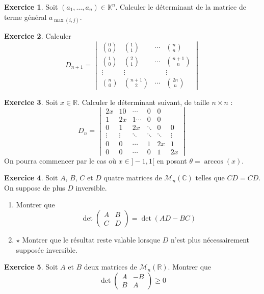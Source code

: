 \documentclass[french]{book}
\newcommand{\R}{\mathbb{R}}
\newcommand{\C}{\mathbb{C}}
\newcommand{\K}{\mathbb{K}}
\theoremstyle{definition}
\newtheorem{ex}{Exercice}[chapter]
\theoremstyle{theorem}
\theoremstyle{remark}
\begin{document}
\begin{ex}
	Soit $(a_1,\ldots,a_n)\in\K^n$. Calculer le déterminant de la matrice de terme général $a_{\max(i,j)}$.
\end{ex}

\begin{ex}
	Calculer $$D_{n+1}=\begin{vmatrix}
		\binom{0}{0}&\binom{1}{1}&\cdots&\binom{n}{n}\\
		\binom{1}{0}&\binom{2}{1}&\cdots&\binom{n+1}{n}\\
		\vdots&\vdots&&\vdots\\
		\binom{n}{0}&\binom{n+1}{2}&\cdots&\binom{2n}{n}
	\end{vmatrix}$$
\end{ex}

\begin{ex}
	Soit $x\in\R$. Calculer le déterminant suivant, de taille $n\times n$ : $$D_n=\begin{vmatrix}
		2x&10&\cdots&0&0\\
		1&2x&1\cdots&0&0\\
		0&1&2x&\ddots&0&0\\
		\vdots&\vdots&\ddots&\ddots&\ddots&\vdots\\
		0&0&\cdots&1&2x&1\\
		0&0&\cdots&0&1&2x
	\end{vmatrix}$$ On pourra commencer par le cas où $x\in]-1,1[$ en posant $\theta=\arccos(x)$.
\end{ex}

\begin{ex}
	Soit $A$, $B$, $C$ et $D$ quatre matrices de $\mathcal{M}_n(\C)$ telles que $CD=CD$. On suppose de plus $D$ inversible. 
	\begin{enumerate}
	\item Montrer que $$\det\begin{pmatrix}
		A&B\\
		C&D
	\end{pmatrix}=\det(AD-BC)$$
	\item $\star$ Montrer que le résultat reste valable lorsque $D$ n'est plus nécessairement supposée inversible.
	\end{enumerate}
\end{ex}

\begin{ex}
	Soit $A$ et $B$ deux matrices de $\mathcal{M}_n(\R)$. Montrer que $$\det\begin{pmatrix}
		A&-B\\
		B&A
	\end{pmatrix}\geqslant0$$
\end{ex}
\end{document}
